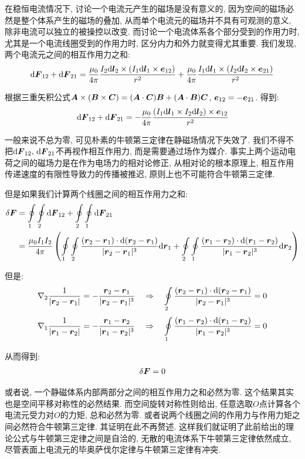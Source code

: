 在稳恒电流情况下, 讨论一个电流元产生的磁场是没有意义的, 因为空间的磁场必然是整个体系产生的磁场的叠加, 从而单个电流元的磁场并不具有可观测的意义, 除非电流可以独立的被操控以改变. 而讨论一个电流体系各个部分受到的作用力时, 尤其是一个电流线圈受到的作用力时, 区分内力和外力就变得尤其重要. 我们发现, 两个电流元之间的相互作用力之和:
\[\textrm{d} \boldsymbol{F}_{12}+\textrm{d} \boldsymbol{F}_{21}=\frac{\mu_0}{4\pi}\frac{I_2\textrm{d} \boldsymbol{l}_2\times (I_1\textrm{d} \boldsymbol{l}_1\times \boldsymbol{e}_{12})}{r^2}+\frac{\mu_0}{4\pi}\frac{I_1\textrm{d} \boldsymbol{l}_1\times (I_2\textrm{d} \boldsymbol{l}_2\times \boldsymbol{e}_{21})}{r^2}\]

根据三重矢积公式$\boldsymbol{A}\times(\boldsymbol{B}\times\boldsymbol{C})=(\boldsymbol{A}\cdot\boldsymbol{C})\boldsymbol{B}+(\boldsymbol{A}\cdot\boldsymbol{B})\boldsymbol{C}$, $\boldsymbol{e}_{12}=-\boldsymbol{e}_{21}$. 得到:
\[\textrm{d} \boldsymbol{F}_{12}+\textrm{d} \boldsymbol{F}_{21}=-\frac{\mu_0}{4\pi} \frac{(I_1\textrm{d} \boldsymbol{l}_1\times I_2\textrm{d} \boldsymbol{l}_2)\times \boldsymbol{e}_{12}}{r^2}\]

一般来说不总为零, 可见朴素的牛顿第三定律在静磁场情况下失效了. 我们不得不把$\textrm{d}\boldsymbol{F}_{12},\,\textrm{d} \boldsymbol{F}_{21}$不再视作相互作用力, 而是需要通过场作为媒介. 事实上两个运动电荷之间的磁场力是在作为电场力的相对论修正, 从相对论的根本原理上, 相互作用传递速度的有限性导致力的传播被推迟, 原则上也不可能符合牛顿第三定律.

但是如果我们计算两个线圈之间的相互作用力之和:
\begin{align*}
\delta\boldsymbol{F}&=\oint\limits_1\oint\limits_2\textrm{d} \boldsymbol{F}_{12}+\oint\limits_2\oint\limits_1\textrm{d} \boldsymbol{F}_{21}\\
&=\frac{\mu_0I_1I_2}{4\pi}\left(\oint\limits_1\oint\limits_2\frac{(\boldsymbol{r}_2-\boldsymbol{r}_1)\cdot\textrm{d}(\boldsymbol{r}_2-\boldsymbol{r}_1)}{|\boldsymbol{r}_2-\boldsymbol{r}_1|^3}\textrm{d}\boldsymbol{r}_1+\oint\limits_2\oint\limits_1\frac{(\boldsymbol{r}_1-\boldsymbol{r}_2)\cdot\textrm{d}(\boldsymbol{r}_1-\boldsymbol{r}_2)}{|\boldsymbol{r}_1-\boldsymbol{r}_2|^3}\textrm{d}\boldsymbol{r}_2\right)
\end{align*}

但是:
\[\nabla_2 \frac{1}{|\boldsymbol{r}_2-\boldsymbol{r}_1|}=-\frac{\boldsymbol{r}_2-\boldsymbol{r}_1}{|\boldsymbol{r}_2-\boldsymbol{r}_1|^3}\quad\Rightarrow\quad \oint\limits_2\frac{(\boldsymbol{r}_2-\boldsymbol{r}_1)\cdot\textrm{d}(\boldsymbol{r}_2-\boldsymbol{r}_1)}{|\boldsymbol{r}_2-\boldsymbol{r}_1|^3}=0\]
\[\nabla_1 \frac{1}{|\boldsymbol{r}_1-\boldsymbol{r}_2|}=-\frac{\boldsymbol{r}_1-\boldsymbol{r}_2}{|\boldsymbol{r}_1-\boldsymbol{r}_2|^3}\quad\Rightarrow\quad \oint\limits_1\frac{(\boldsymbol{r}_1-\boldsymbol{r}_2)\cdot\textrm{d}(\boldsymbol{r}_1-\boldsymbol{r}_2)}{|\boldsymbol{r}_1-\boldsymbol{r}_2|^3}=0\]

从而得到:
\[\delta\boldsymbol{F}=0\]

或者说, 一个静磁体系内部两部分之间的相互作用力之和必然为零. 这个结果其实也是空间平移对称性的必然结果. 而空间旋转对称性则给出, 任意选取$O$点计算各个电流元受力对$O$的力矩, 总和必然为零. 或者说两个线圈之间的作用力与作用力矩之间必然符合牛顿第三定律. 其证明在此不再赘述. 这样我们就证明了此前给出的理论公式与牛顿第三定律之间是自洽的, 无散的电流体系下牛顿第三定律依然成立, 尽管表面上电流元的毕奥萨伐尔定律与牛顿第三定律有冲突.


